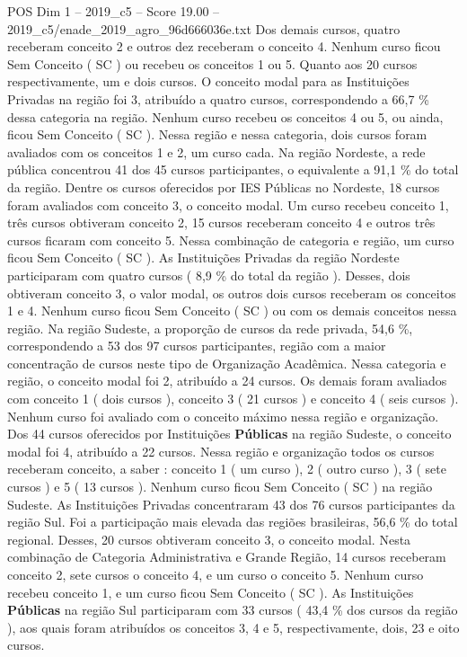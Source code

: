 \begin{textsample}{POS Dim 1 – 2019\_c5 – Score 19.00 – 2019\_c5/enade\_2019\_agro\_96d666036e.txt}
Dos demais cursos, quatro receberam conceito 2 e outros dez receberam o conceito 4.
Nenhum curso ficou Sem Conceito ( SC ) ou recebeu os conceitos 1 ou 5.
Quanto aos 20 cursos respectivamente, um e dois cursos.
O conceito modal para as Instituições Privadas na região foi 3, atribuído a quatro cursos, correspondendo a 66,7 \% dessa categoria na região.
Nenhum curso recebeu os conceitos 4 ou 5, ou ainda, ficou Sem Conceito ( SC ).
Nessa região e nessa categoria, dois cursos foram avaliados com os conceitos 1 e 2, um curso cada.
Na região Nordeste, a rede pública concentrou 41 dos 45 cursos participantes, o equivalente a 91,1 \% do total da região.
Dentre os cursos oferecidos por IES Públicas no Nordeste, 18 cursos foram avaliados com conceito 3, o conceito modal.
Um curso recebeu conceito 1, três cursos obtiveram conceito 2, 15 cursos receberam conceito 4 e outros três cursos ficaram com conceito 5.
Nessa combinação de categoria e região, um curso ficou Sem Conceito ( SC ).
As Instituições Privadas da região Nordeste participaram com quatro cursos ( 8,9 \% do total da região ).
Desses, dois obtiveram conceito 3, o valor modal, os outros dois cursos receberam os conceitos 1 e 4.
Nenhum curso ficou Sem Conceito ( SC ) ou com os demais conceitos nessa região.
Na região Sudeste, a proporção de cursos da rede privada, 54,6 \%, correspondendo a 53 dos 97 cursos participantes, região com a maior concentração de cursos neste tipo de Organização Acadêmica.
Nessa categoria e região, o conceito modal foi 2, atribuído a 24 cursos.
Os demais foram avaliados com conceito 1 ( dois cursos ), conceito 3 ( 21 cursos ) e conceito 4 ( seis cursos ).
Nenhum curso foi avaliado com o conceito máximo nessa região e organização.
Dos 44 cursos oferecidos por Instituições \textbf{Públicas} na região Sudeste, o conceito modal foi 4, atribuído a 22 cursos.
Nessa região e organização todos os cursos receberam conceito, a saber : conceito 1 ( um curso ), 2 ( outro curso ), 3 ( sete cursos ) e 5 ( 13 cursos ).
Nenhum curso ficou Sem Conceito ( SC ) na região Sudeste.
As Instituições Privadas concentraram 43 dos 76 cursos participantes da região Sul.
Foi a participação mais elevada das regiões brasileiras, 56,6 \% do total regional.
Desses, 20 cursos obtiveram conceito 3, o conceito modal.
Nesta combinação de Categoria Administrativa e Grande Região, 14 cursos receberam conceito 2, sete cursos o conceito 4, e um curso o conceito 5.
Nenhum curso recebeu conceito 1, e um curso ficou Sem Conceito ( SC ).
As Instituições \textbf{Públicas} na região Sul participaram com 33 cursos ( 43,4 \% dos cursos da região ), aos quais foram atribuídos os conceitos 3, 4 e 5, respectivamente, dois, 23 e oito cursos.

\end{textsample}
